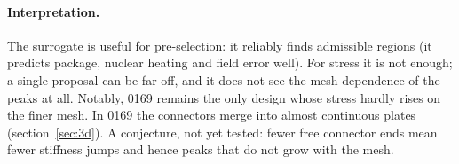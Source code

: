\paragraph{Interpretation.} The surrogate is useful for pre-selection: it reliably finds admissible regions (it
predicts package, nuclear heating and field error well). For stress it is not enough; a single proposal can be far
off, and it does not see the mesh dependence of the peaks at all. Notably, 0169 remains the only design whose stress
hardly rises on the finer mesh. In 0169 the connectors merge into almost continuous plates (section~\ref{sec:3d}). A
conjecture, not yet tested: fewer free connector ends mean fewer stiffness jumps and hence peaks that do not grow
with the mesh.
